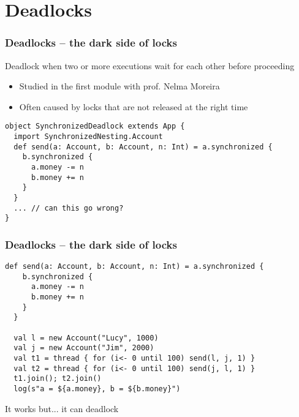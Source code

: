 \documentclass[aspectratio=169]{beamer}
\begin{document}
\section{Deadlocks}

\begin{frame}[fragile]\frametitle{Deadlocks -- the dark side of locks}

\begin{alertblock}{Deadlock}
  when two or more executions wait for each other before proceeding
\end{alertblock}

\begin{itemize}
  \item Studied in the first module with prof. Nelma Moreira
  \item Often caused by locks that are not released at the right time
\end{itemize}

\begin{lstlisting}[emph={assert,sleep,log,thread,join,synchronized}]
object SynchronizedDeadlock extends App {
  import SynchronizedNesting.Account
  def send(a: Account, b: Account, n: Int) = a.synchronized {
    b.synchronized {
      a.money -= n
      b.money += n
    }
  }
  ... // can this go wrong?
}
\end{lstlisting}
\end{frame}


\begin{frame}[fragile]\frametitle{Deadlocks -- the dark side of locks}
\begin{lstlisting}[emph={assert,sleep,log,thread,join,synchronized}]
  def send(a: Account, b: Account, n: Int) = a.synchronized {
    b.synchronized {
      a.money -= n
      b.money += n
    }
  }

  val l = new Account("Lucy", 1000)
  val j = new Account("Jim", 2000)
  val t1 = thread { for (i<- 0 until 100) send(l, j, 1) }
  val t2 = thread { for (i<- 0 until 100) send(j, l, 1) }
  t1.join(); t2.join()
  log(s"a = ${a.money}, b = ${b.money}")
\end{lstlisting}

{\Large \pause It works but... \pause \alert{it can deadlock}}
\end{frame}
\end{document}
